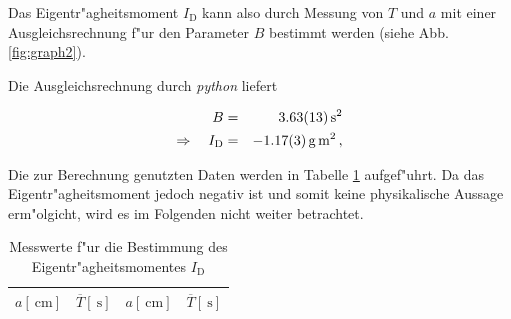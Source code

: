 
		\clearpage

		Das Eigentr"agheitsmoment $I_\mathrm{D}$ kann also durch Messung von $T$ und $a$ mit einer Ausgleichsrechnung f"ur den Parameter $B$ bestimmt werden (siehe Abb. \ref{fig:graph2}).

		Die Ausgleichsrechnung durch \emph{python} liefert

		\begin{eqnarray*}
			B & = & \SI{3.63 (13)}{\second \squared} \\
			\Rightarrow \quad I_\mathrm{D} & = & \SI{-1.17 (3)}{\gram \meter \squared} \,,
		\end{eqnarray*}



		Die zur Berechnung genutzten Daten werden in Tabelle \ref{tabelle:eigentraegheitsmoment} aufgef"uhrt.
		Da das Eigentr"agheitsmoment jedoch negativ ist und somit keine physikalische Aussage erm"olgicht, wird es im Folgenden nicht weiter betrachtet.

		\begin{table}[h!]
			\begin{center}
				\caption{Messwerte f"ur die Bestimmung des Eigentr"agheitsmomentes $I_\mathrm{D}$ \label{tabelle:eigentraegheitsmoment}}
				\begin{tabular}{|c|c||c|c|}
					\hline
					$a [\SI{}{\centi \meter}]$ & $\overline{T} [\SI{}{\second}]$ & $a [\SI{}{\centi \meter}]$ & $\overline{T} [\SI{}{\second}]$\\
					\hline 
					\hline
					
					\hline 
				\end{tabular}
			\end{center}
		\end{table}

